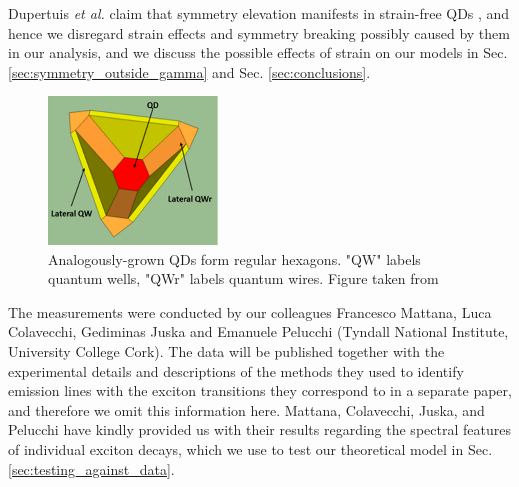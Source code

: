 \documentclass[12pt]{article}
\begin{document}
Dupertuis \textit{et al.} claim that symmetry elevation manifests in strain-free QDs \cite[p. 4]{dupertuis}, and hence we disregard strain effects and symmetry breaking possibly caused by them in our analysis, and we discuss the possible effects of strain on our models in Sec. \ref{sec:symmetry_outside_gamma} and Sec. \ref{sec:conclusions}.

\begin{figure}
\begin{center}
    \includegraphics[width=0.4\textwidth]{figures/hexagonal_qds}
 \caption{Analogously-grown QDs form regular hexagons. "QW" labels quantum wells, "QWr" labels quantum wires. Figure taken from \cite[Fig. 1]{hexagon}\label{fig:hexagonal_qds}}
\end{center}
\end{figure}

The measurements were conducted by our colleagues Francesco Mattana, Luca Colavecchi, Gediminas Juska and Emanuele Pelucchi (Tyndall National Institute, University College Cork). The data will be published together with the experimental details and descriptions of the methods they used to identify emission lines with the exciton transitions they correspond to in a separate paper, and therefore we omit this information here. Mattana, Colavecchi, Juska, and Pelucchi have kindly provided us with their results regarding the spectral features of individual exciton decays, which we use to test our theoretical model in Sec. \ref{sec:testing_against_data}. 

\pagebreak








\end{document}
